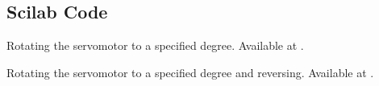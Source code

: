 \begin{enumerate}
\end{enumerate}

\subsection{Scilab Code}
\lstset{style=mystyle}
\label{sec:servo-scilab-code}

\begin{scicode}
   {Rotating
    the servomotor to a specified degree.  Available at
    .}
  \label{sci:servo-init}
  
\end{scicode}

\begin{scicode}
   {Rotating
    the servomotor to a specified degree and reversing.  Available at
    .}
  \label{sci:servo-reverse}
  
\end{scicode}

\begin{scicode}
  \label{sci:servo-loop}
  
\end{scicode}

